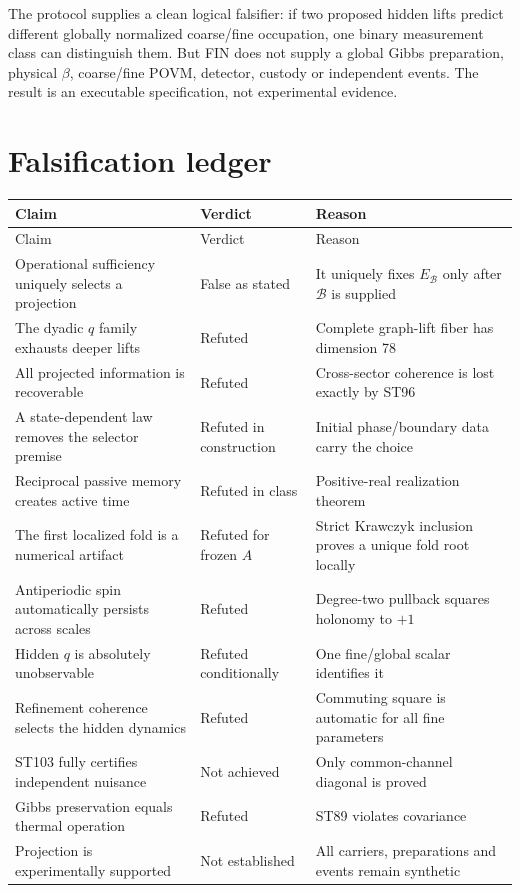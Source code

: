 \documentclass[11pt,a4paper]{article}
\begin{document}
The protocol supplies a clean logical falsifier: if two proposed hidden lifts predict different globally normalized coarse/fine occupation, one binary measurement class can distinguish them. But FIN does not supply a global Gibbs preparation, physical $\beta$, coarse/fine POVM, detector, custody or independent events. The result is an executable specification, not experimental evidence.

\section{Falsification ledger}

\begin{longtable}{@{}p{}p{}p{}@{}}
\toprule Claim & Verdict & Reason\\\midrule\endfirsthead
\toprule Claim & Verdict & Reason\\\midrule\endhead
Operational sufficiency uniquely selects a projection & False as stated & It uniquely fixes $E_{\mathcal B}$ only after $\mathcal B$ is supplied\\
The dyadic $q$ family exhausts deeper lifts & Refuted & Complete graph-lift fiber has dimension 78\\
All projected information is recoverable & Refuted & Cross-sector coherence is lost exactly by ST96\\
A state-dependent law removes the selector premise & Refuted in construction & Initial phase/boundary data carry the choice\\
Reciprocal passive memory creates active time & Refuted in class & Positive-real realization theorem\\
The first localized fold is a numerical artifact & Refuted for frozen $A$ & Strict Krawczyk inclusion proves a unique fold root locally\\
Antiperiodic spin automatically persists across scales & Refuted & Degree-two pullback squares holonomy to $+1$\\
Hidden $q$ is absolutely unobservable & Refuted conditionally & One fine/global scalar identifies it\\
Refinement coherence selects the hidden dynamics & Refuted & Commuting square is automatic for all fine parameters\\
ST103 fully certifies independent nuisance & Not achieved & Only common-channel diagonal is proved\\
Gibbs preservation equals thermal operation & Refuted & ST89 violates covariance\\
Projection is experimentally supported & Not established & All carriers, preparations and events remain synthetic\\
\bottomrule
\end{longtable}
\end{document}

